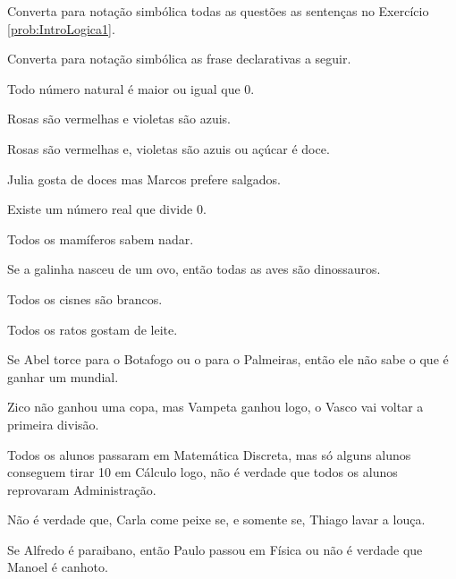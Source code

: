 \begin{problem}\label{prob:IntroLogica3}
	Converta para notação simbólica todas as questões as sentenças no Exercício \ref{prob:IntroLogica1}.
\end{problem}

\begin{problem}\label{prob:IntroLogica4}
	Converta para notação simbólica as frase declarativas a seguir.
\end{problem}

\begin{exerList}
	\item Todo número natural é maior ou igual que 0.
	\item Rosas são vermelhas e violetas são azuis.
	\item Rosas são vermelhas e, violetas são azuis ou açúcar é doce.
	\item Julia gosta de doces mas Marcos prefere salgados.
	\item Existe um número real que divide 0.
	\item Todos os mamíferos sabem nadar.
	\item Se a galinha nasceu de um ovo, então todas as aves são dinossauros.
	\item Todos os cisnes são brancos.
	\item Todos os ratos gostam de leite.
	\item Se Abel torce para o Botafogo ou o para o Palmeiras, então ele não sabe o que é ganhar um mundial.
	\item Zico não ganhou uma copa, mas Vampeta ganhou logo, o Vasco vai voltar a primeira divisão.
	\item Todos os alunos passaram em Matemática Discreta, mas só alguns alunos  conseguem tirar 10 em Cálculo logo, não é verdade que todos os alunos reprovaram Administração.
	\item Não é verdade que, Carla come peixe se, e somente se, Thiago lavar a louça.
	\item Se Alfredo é paraibano, então Paulo passou em Física ou não é verdade que Manoel é canhoto. 
\end{exerList}